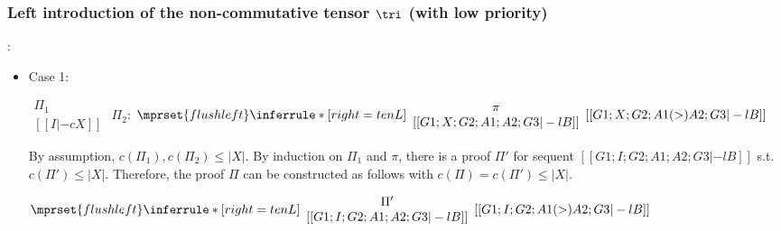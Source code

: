\subsubsection{Left introduction of the non-commutative tensor $\tri$ (with low priority)}:
\begin{itemize}
\item Case 1:
      \begin{center}
        \scriptsize
        \begin{math}
          \begin{array}{c}
            \Pi_1 \\
            {[[I |-c X]]}
          \end{array}
        \end{math}
        \qquad\qquad
        $\Pi_2$:
        \begin{math}
          $$\mprset{flushleft}
          \inferrule* [right={\tiny tenL}] {
            {
              \begin{array}{c}
                \pi \\
                {[[G1; X; G2; A1; A2; G3 |-l B]]}
              \end{array}
            }
          }{[[G1; X; G2; A1 (>) A2; G3 |-l B]]}
        \end{math}
      \end{center}
      By assumption, $c(\Pi_1),c(\Pi_2)\leq |X|$. By induction on $\Pi_1$
      and $\pi$, there is a proof $\Pi'$ for sequent
      $[[G1; I; G2; A1; A2; G3 |-l B]]$ s.t. $c(\Pi') \leq |X|$. Therefore,
      the proof $\Pi$ can be constructed as follows with
      $c(\Pi) = c(\Pi') \leq |X|$.
      \begin{center}
        \scriptsize
        \begin{math}
          $$\mprset{flushleft}
          \inferrule* [right={\tiny tenL}] {
            {
              \begin{array}{c}
                \Pi' \\
                {[[G1; I; G2; A1; A2; G3 |-l B]]}
              \end{array}
            }
          }{[[G1; I; G2; A1 (>) A2; G3 |-l B]]}
        \end{math}
      \end{center}


\end{itemize}
